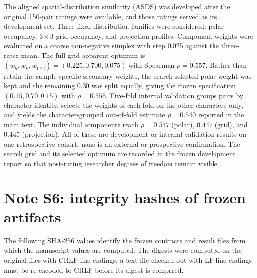 \documentclass[pdflatex,sn-basic,Numbered]{sn-jnl}
\begin{document}
The aligned spatial-distribution similarity (ASDS) was developed after the
original 150-pair ratings were available, and those ratings served as its
development set. Three fixed distribution families were considered: polar
occupancy, \(3\times3\) grid occupancy, and projection profiles. Component
weights were evaluated on a coarse non-negative simplex with step 0.025
against the three-rater mean. The full-grid apparent optimum is
\((w_g,w_p,w_{\mathrm{proj}})=(0.225,0.700,0.075)\) with Spearman
\(\rho=0.557\). Rather than retain the sample-specific secondary weights, the
search-selected polar weight was kept and the remaining 0.30 was split
equally, giving the frozen specification \((0.15,0.70,0.15)\) with
\(\rho=0.556\). Five-fold internal validation groups pairs by character
identity, selects the weights of each fold on the other characters only, and
yields the character-grouped out-of-fold estimate \(\rho=0.540\) reported in
the main text. The individual components reach \(\rho=0.547\) (polar),
\(0.447\) (grid), and \(0.445\) (projection). All of these are development or
internal-validation results on one retrospective cohort; none is an external
or prospective confirmation. The search grid and its selected optimum are recorded in the frozen
development report so that post-rating researcher degrees of freedom remain
visible.

\clearpage
\section*{Note S6: integrity hashes of frozen artifacts}

The following SHA-256 values identify the frozen contracts and result files
from which the manuscript values are computed. The digests were computed on
the original files with CRLF line endings; a text file checked out with LF
line endings must be re-encoded to CRLF before its digest is compared.
\end{document}
